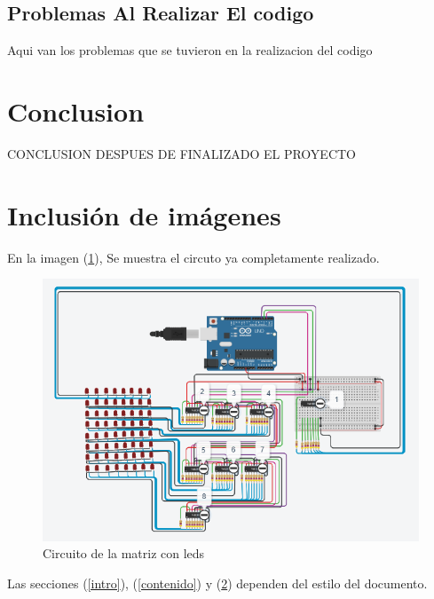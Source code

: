 \documentclass{article}
\begin{document}
\subsection{Problemas Al Realizar El codigo}
Aqui van los problemas que se tuvieron en la realizacion del codigo
\section{Conclusion} \label{Conclusion}
CONCLUSION DESPUES DE FINALIZADO EL PROYECTO
\section{Inclusión de imágenes} \label{images}
En la imagen (\ref{fig:circuito.PNG}), Se muestra el circuto ya completamente realizado.

\begin{figure}[h]
\includegraphics[scale=0.7]{circuito.PNG}
\graphicspath{ {images/} }
\centering
\caption{Circuito de la matriz con leds}
\label{fig:circuito.PNG}
\end{figure}

Las secciones (\ref{intro}), (\ref{contenido}) y (\ref{images}) dependen del estilo del documento.


\end{document}
